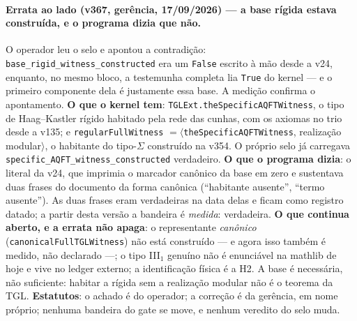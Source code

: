 \documentclass[11pt]{article}
\theoremstyle{definition}\newtheorem{deriv}{Derivação}
\begin{document}
\paragraph*{Errata ao lado (v367, gerência, 17/09/2026) --- a base rígida estava construída, e o programa dizia que não.} O operador leu o selo e apontou a contradição: \texttt{base\_rigid\_witness\_constructed} era um \texttt{False} escrito à mão desde a v24, enquanto, no mesmo bloco, a testemunha completa lia \texttt{True} do kernel --- e o primeiro componente dela é justamente essa base. A medição confirma o apontamento. \textbf{O que o kernel tem}: \texttt{TGLExt.theSpecificAQFTWitness}, o tipo de Haag--Kastler rígido habitado pela rede das cunhas, com os axiomas no trio desde a v135; e \texttt{regularFullWitness} $=\langle$\texttt{theSpecificAQFTWitness}, realização modular$\rangle$, o habitante do tipo-$\Sigma$ construído na v354. O próprio selo já carregava \texttt{specific\_AQFT\_witness\_constructed} verdadeiro. \textbf{O que o programa dizia}: o literal da v24, que imprimia o marcador canônico da base em zero e sustentava duas frases do documento da forma canônica (``habitante ausente'', ``termo ausente''). As duas frases eram verdadeiras na data delas e ficam como registro datado; a partir desta versão a bandeira é \emph{medida}: verdadeira. \textbf{O que continua aberto, e a errata não apaga}: o representante \emph{canônico} (\texttt{canonicalFullTGLWitness}) não está construído --- e agora isso também é medido, não declarado ---; o tipo III$_1$ genuíno não é enunciável na mathlib de hoje e vive no ledger externo; a identificação física é a H2. A base é necessária, não suficiente: habitar a rígida sem a realização modular não é o teorema da TGL. \textbf{Estatutos}: o achado é do operador; a correção é da gerência, em nome próprio; nenhuma bandeira do gate se move, e nenhum veredito do selo muda.
\end{document}
